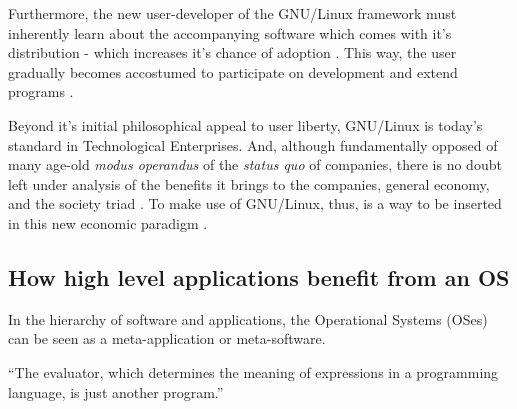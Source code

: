 \documentclass[
12pt,				%
openright,			%
oneside,			%
a4paper,			%
brazil,				%
english,			%
]{abntex2}
\begin{document}
Furthermore, the new user-developer of the GNU/Linux framework must
inherently learn about the accompanying software which comes with it's
distribution - which increases it's chance of adoption
\cite{west2001open}. This way, the user gradually becomes accostumed to
participate on development and extend programs \cite{hertel2003motivation}.

Beyond it's initial philosophical appeal to user liberty, GNU/Linux is
today's standard in Technological Enterprises. And, although
fundamentally opposed of many age-old \textit{modus operandus} of the
\textit{status quo} of companies, there is no doubt left under
analysis of the benefits it brings to the companies, general economy, and
the society triad \cite{moody2009rebel}. To make use of GNU/Linux,
thus, is a way to be inserted in this new economic paradigm \cite{hippel2003open,peters2009open}.

\subsection{How high level applications benefit from an OS}

In the hierarchy of software and applications, the Operational Systems (OSes) can be seen as a meta-application or meta-software. 

``The evaluator, which determines the meaning of expressions in a
programming language, is just another program.'' \cite{abelson1996structure}
\end{document}
